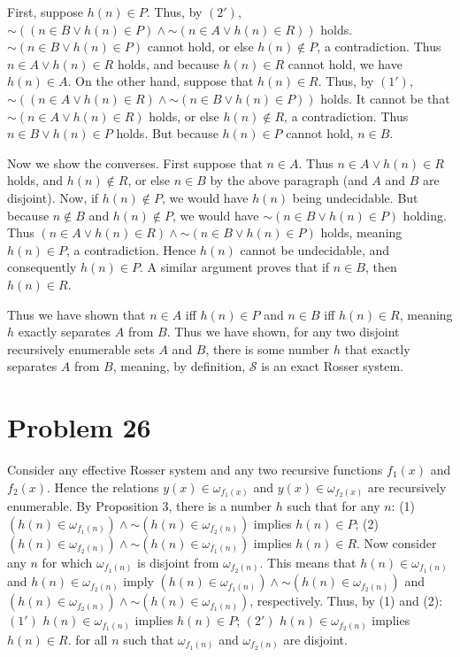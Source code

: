 \documentclass{article}
\newcommand*{\oldneg}{\mathord{\sim}}
\theoremstyle{definition}
\begin{document}
First, suppose $h(n)\in P$. Thus, by $(2')$, $\oldneg((n\in B\vee h(n)\in P)\wedge\oldneg (n\in A\vee h(n)\in R))$ holds. $\oldneg(n\in B\vee h(n)\in P)$ cannot hold, or else $h(n)\notin P$, 
a contradiction. Thus $n\in A\vee h(n)\in R$ holds, and because $h(n)\in R$ cannot hold, we have $h(n)\in A$. On the other hand, suppose that $h(n)\in R$. 
Thus, by $(1')$, $\oldneg((n\in A\vee h(n)\in R)\wedge\oldneg (n\in B\vee h(n)\in P))$ holds. It cannot be that $\oldneg(n\in A\vee h(n)\in R)$ holds, or else $h(n)\notin R$, a contradiction.
Thus $n\in B\vee h(n)\in P$ holds. But because $h(n)\in P$ cannot hold, $n\in B$.


Now we show the converses. First suppose that $n\in A$. Thus $n\in A\vee h(n)\in R$ holds, and $h(n)\notin R$, or else $n\in B$ by the above paragraph (and $A$ and $B$ are disjoint). 
Now, if $h(n)\notin P$, we would have $h(n)$ being undecidable. But because $n\notin B$ and $h(n)\notin P$, we would have $\oldneg (n\in B\vee h(n)\in P)$ holding. Thus 
$(n\in A\vee h(n)\in R)\wedge\oldneg (n\in B\vee h(n)\in P)$ holds, meaning $h(n)\in P$, a contradiction. Hence $h(n)$ cannot be undecidable, and consequently $h(n)\in P$. A similar argument 
proves that if $n\in B$, then $h(n)\in R$. 


Thus we have shown that $n\in A$ iff $h(n)\in P$ and $n\in B$ iff $h(n)\in R$, meaning $h$ exactly separates $A$ from $B$. Thus we have shown, for any two disjoint recursively enumerable sets $A$ 
and $B$, there is some number $h$ that exactly separates $A$ from $B$, meaning, by definition, $\mathcal{S}$ is an exact Rosser system.

\section*{Problem 26}
Consider any effective Rosser system and any two recursive functions $f_1(x)$ and $f_2(x)$. Hence the relations $y(x)\in\omega_{f_1(x)}$ and $y(x)\in\omega_{f_2(x)}$ are recursively enumerable. 
By Proposition 3, there is a number $h$ such that for any $n$:\newline
(1) $(h(n)\in\omega_{f_1(n)})\wedge\oldneg(h(n)\in\omega_{f_2(n)})$ implies $h(n)\in P$;\newline
(2) $(h(n)\in\omega_{f_2(n)})\wedge\oldneg(h(n)\in\omega_{f_1(n)})$ implies $h(n)\in R$.\newline
Now consider any $n$ for which $\omega_{f_1(n)}$ is disjoint from $\omega_{f_2(n)}$. This means that $h(n)\in\omega_{f_1(n)}$ and $h(n)\in\omega_{f_2(n)}$ imply 
$(h(n)\in\omega_{f_1(n)})\wedge\oldneg(h(n)\in\omega_{f_2(n)})$ and $(h(n)\in\omega_{f_2(n)})\wedge\oldneg(h(n)\in\omega_{f_1(n)})$, respectively. Thus, by (1) and (2):\newline
$(1')$ $h(n)\in\omega_{f_1(n)}$ implies $h(n)\in P$;\newline
$(2')$ $h(n)\in\omega_{f_2(n)}$ implies $h(n)\in R$.\newline
for all $n$ such that $\omega_{f_1(n)}$ and $\omega_{f_2(n)}$ are disjoint.
\end{document}
